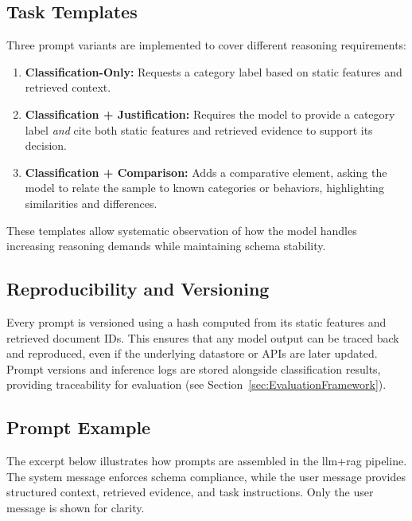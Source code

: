 \subsection{Task Templates}\label{subsec:TaskTypes}
Three prompt variants are implemented to cover different reasoning requirements:

\begin{enumerate}
      \item \textbf{Classification-Only:} Requests a category label based on static features and
            retrieved context.
      \item \textbf{Classification + Justification:} Requires the model to provide a category label
            \emph{and} cite both static features and retrieved evidence to support its decision.
      \item \textbf{Classification + Comparison:} Adds a comparative element, asking the model to
            relate the sample to known categories or behaviors, highlighting similarities and differences.
\end{enumerate}

These templates allow systematic observation of how the model handles increasing reasoning demands
while maintaining schema stability.

\subsection{Reproducibility and Versioning}\label{subsec:PromptVersioning}
Every prompt is versioned using a hash computed from its static features and retrieved document
IDs. This ensures that any model output can be traced back and reproduced, even if the underlying
datastore or APIs are later updated. Prompt versions and inference logs are stored alongside
classification results, providing traceability for evaluation (see
Section~\ref{sec:EvaluationFramework}).

\subsection{Prompt Example}\label{subsec:PromptExample}
The excerpt below illustrates how prompts are assembled in the \gls{llm}+\gls{rag} pipeline. The
system message enforces schema compliance, while the user message provides structured context,
retrieved evidence, and task instructions. Only the user message is shown for clarity.

